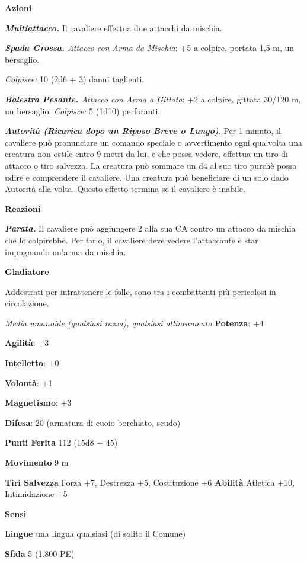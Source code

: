 \begin{multicols}{2}
\textbf{Azioni}

\emph{\textbf{Multiattacco.}} Il cavaliere effettua due attacchi da
mischia.

\emph{\textbf{Spada Grossa.} Attacco con Arma da Mischia}: +5 a colpire,
portata 1,5 m, un bersaglio.

\emph{Colpisce:} 10 (2d6 + 3) danni taglienti.

\emph{\textbf{Balestra Pesante.} Attacco con Arma a Gittata}: +2 a
colpire, gittata 30/120 m, un bersaglio. \emph{Colpisce:} 5 (1d10)
perforanti.

\emph{\textbf{Autorità (Ricarica dopo un Riposo Breve o Lungo)}}. Per 1
minuto, il cavaliere può pronunciare un comando speciale o avvertimento
ogni qualvolta una creatura non ostile entro 9 metri da lui, e che possa
vedere, effettua un tiro di attacco o tiro salvezza. La creatura può
sommare un d4 al suo tiro purchè possa udire e comprendere il cavaliere.
Una creatura può beneficiare di un solo dado Autorità alla volta. Questo
effetto termina se il cavaliere è inabile.

\textbf{Reazioni}

\emph{\textbf{Parata.}} Il cavaliere può aggiungere 2 alla sua CA contro
un attacco da mischia che lo colpirebbe. Per farlo, il cavaliere deve
vedere l'attaccante e star impugnando un'arma da mischia.



\textbf{Gladiatore}

Addestrati per intrattenere le folle, sono tra i combattenti più
pericolosi in circolazione.

\emph{Media umanoide (qualsiasi razza), qualsiasi allineamento}
\textbf{Potenza}: +4

\textbf{Agilità}: +3

\textbf{Intelletto}: +0

\textbf{Volontà}: +1

\textbf{Magnetismo}: +3

\textbf{Difesa}: 20 (armatura di cuoio borchiato, scudo)

\textbf{Punti Ferita} 112 (15d8 + 45)

\textbf{Movimento} 9 m

\textbf{Tiri Salvezza} Forza +7, Destrezza +5, Costituzione +6
\textbf{Abilità} Atletica +10, Intimidazione +5

\textbf{Sensi} 

\textbf{Lingue} una lingua qualsiasi (di solito il Comune)

\textbf{Sfida} 5 (1.800 PE)


\end{multicols}
